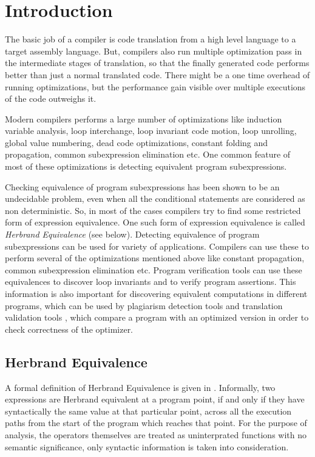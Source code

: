 \chapter{Introduction}
\label{chap:chapter1}
\hspace{3mm}

The basic job of a compiler is code translation from a high level 
language to a target assembly language. But, compilers also run
multiple optimization pass in the intermediate stages of translation, 
so that the finally generated code performs better than just a normal 
translated code. There might be a one time overhead of 
running optimizations, but the performance gain visible over multiple 
executions of the code outweighs it.

Modern compilers performs a large number of optimizations like
induction variable analysis, loop interchange, loop invariant code
motion, loop unrolling, global value numbering, dead code 
optimizations, constant folding and propagation, common subexpression 
elimination etc. One common feature of most of these optimizations is 
detecting equivalent program subexpressions. 

Checking equivalence of program subexpressions has been shown to be 
an undecidable problem, even when all the conditional statements are 
considered as non deterministic. So, in most of the cases compilers 
try to find some restricted form of expression equivalence. One such
form of expression equivalence is called  \textit{Herbrand 
Equivalence} (see below).
Detecting equivalence of program subexpressions can be used for 
variety of applications. Compilers can use these to perform several 
of the optimizations mentioned above like constant propagation, 
common subexpression elimination etc. Program verification tools can 
use these equivalences to discover loop invariants and to verify 
program assertions. This information is also important for discovering
equivalent computations in different programs, which can be used by
plagiarism detection tools and translation validation tools \cite
{Necula, Pnueli}, which compare a program with an optimized version
in order to check correctness of the optimizer.


\section{Herbrand Equivalence}
A formal definition of Herbrand Equivalence is given in \cite{Ruthing}.
Informally, two expressions are Herbrand equivalent at a program 
point, if and only if they have syntactically the same value at that 
particular point, across all the execution paths from the start of 
the program which reaches that point. For the purpose of analysis, 
the operators themselves are treated as uninterprated functions with 
no semantic significance, only syntactic information is taken into 
consideration.

